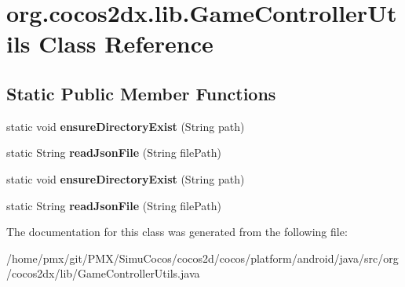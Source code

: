 \hypertarget{classorg_1_1cocos2dx_1_1lib_1_1GameControllerUtils}{}\section{org.\+cocos2dx.\+lib.\+Game\+Controller\+Utils Class Reference}
\label{classorg_1_1cocos2dx_1_1lib_1_1GameControllerUtils}
\subsection*{Static Public Member Functions}
\begin{DoxyCompactItemize}
\item 
\mbox{\label{classorg_1_1cocos2dx_1_1lib_1_1GameControllerUtils_a35a389a29e430cfed0841d8e2571cd31}} 
static void {\bfseries ensure\+Directory\+Exist} (String path)
\item 
\mbox{\label{classorg_1_1cocos2dx_1_1lib_1_1GameControllerUtils_ae52012c6a66568830e3e9c82819212ad}} 
static String {\bfseries read\+Json\+File} (String file\+Path)
\item 
\mbox{\label{classorg_1_1cocos2dx_1_1lib_1_1GameControllerUtils_a35a389a29e430cfed0841d8e2571cd31}} 
static void {\bfseries ensure\+Directory\+Exist} (String path)
\item 
\mbox{\label{classorg_1_1cocos2dx_1_1lib_1_1GameControllerUtils_ae52012c6a66568830e3e9c82819212ad}} 
static String {\bfseries read\+Json\+File} (String file\+Path)
\end{DoxyCompactItemize}


The documentation for this class was generated from the following file\+:\begin{DoxyCompactItemize}
\item 
/home/pmx/git/\+P\+M\+X/\+Simu\+Cocos/cocos2d/cocos/platform/android/java/src/org/cocos2dx/lib/Game\+Controller\+Utils.\+java\end{DoxyCompactItemize}

